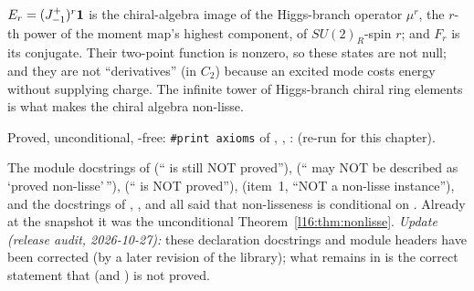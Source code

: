 \begin{physics}
$E_r = (J^+_{-1})^r\mathbf{1}$ is the chiral-algebra image of the Higgs-branch operator $\mu^r$, the $r$-th power of the
moment map's highest component, of $SU(2)_R$-spin $r$; and $F_r$ is its conjugate. Their two-point function is nonzero, so these
states are not null; and they are not ``derivatives'' (in $C_2$) because an excited mode costs energy without supplying charge.
The infinite tower of Higgs-branch chiral ring elements is what makes the chiral algebra non-lisse.
\end{physics}

\begin{status}
Proved, unconditional, -free: \texttt{\#print axioms} of \allowbreak{}\allowbreak{}\allowbreak{},
\allowbreak{}\allowbreak{}, \allowbreak{}\allowbreak{}:
\lean{[propext, Classical.}\allowbreak{}\allowbreak\lean{sound]} (re-run for this chapter).
\end{status}

\begin{warning}[title={Stale ``non-lisseness is not proved'' documentation (documentation only)}]
The module docstrings of  (`` is still NOT proved''),
 (`` may NOT be described as `proved non-lisse'\,''),
 (`` is NOT proved''),  (item~1,
``NOT a non-lisse instance''), and the docstrings of \allowbreak {}\allowbreak{}\allowbreak{},
\allowbreak{}\allowbreak{}, \allowbreak{}\allowbreak{}\allowbreak{}\allowbreak{} and
\allowbreak{}\allowbreak{}\allowbreak{}\allowbreak{}\allowbreak{} all said that non-lisseness is conditional on
. Already at the snapshot it was the unconditional Theorem~\ref{l16:thm:nonlisse}. \emph{Update
(release audit, 2026-10-27):} these declaration docstrings and module headers have been corrected (by a later revision of
the library); what remains in  is the correct statement that
 (and ) is not proved.
\end{warning}

